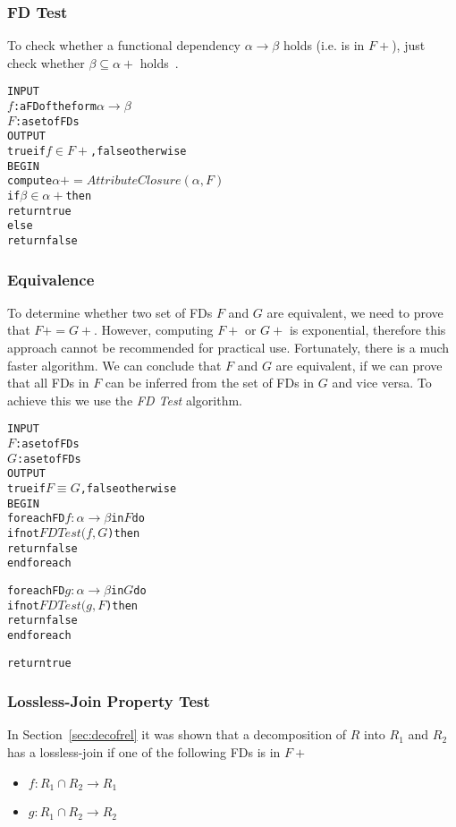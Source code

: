 \subsubsection{FD Test}
To check whether a functional dependency $\alpha \rightarrow \beta $ 
holds (i.e. is in $F+$), just check whether $\beta \subseteq \alpha+$ holds~\cite{bdb4}.
 
\begin{alltt}
INPUT 
  \(f\) : a FD of the form \(\alpha \rightarrow \beta\)
  \(F\) : a set of FDs
OUTPUT 
  true if \(f \in F+\), false otherwise
BEGIN
  compute \(\alpha+ = AttributeClosure(\alpha, F)\)   
  if \(\beta \in \alpha+\) then
    return true
  else
    return false
\end{alltt}
  
\subsubsection{Equivalence}
To determine whether two set of FDs $F$ and $G$ are equivalent, we need to prove that $F+ = G+$. 
However, computing $F+$ or
$G+$ is exponential, therefore this approach cannot be recommended for practical use.
Fortunately, there is a much faster algorithm. We can conclude that $F$ and $G$ are
equivalent, if we can prove that all FDs in $F$ can be inferred from the set of FDs in $G$ and vice
versa. To achieve this we use the \textit{FD Test} algorithm.

\begin{alltt}
INPUT 
  \(F\) : a set of FDs
  \(G\) : a set of FDs
OUTPUT 
  true if \(F \equiv G\), false otherwise
BEGIN
  foreach FD \(f : \alpha \rightarrow \beta\) in \(F\) do
    if not \(FDTest(f, G\)) then
      return false
  end foreach
  
  foreach FD \(g : \alpha \rightarrow \beta\) in \(G\) do
    if not \(FDTest(g, F\)) then
      return false
  end foreach
  
  return true
\end{alltt}

\subsubsection{Lossless-Join Property Test}
In Section~\ref{sec:decofrel} it was shown that a decomposition of $R$ into $R_1$ and $R_2$ 
has a lossless-join if one of the following FDs is in $F+$
\begin{itemize}
  \item $f : R_1 \cap R_2 \rightarrow R_1$ 
  \item $g : R_1 \cap R_2 \rightarrow R_2$ 
\end{itemize}

